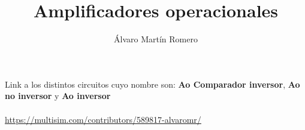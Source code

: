 \documentclass[a4paper,10pt]{article}
\title{Amplificadores operacionales}
\author{Álvaro Martín Romero}
\begin{document}
    \maketitle
    Link a los distintos circuitos cuyo nombre son:  \textbf{Ao Comparador inversor}, \textbf{Ao no inversor} y \textbf{Ao inversor}\\
\\
\url{https://multisim.com/contributors/589817-alvaromr/}
\end{document}

